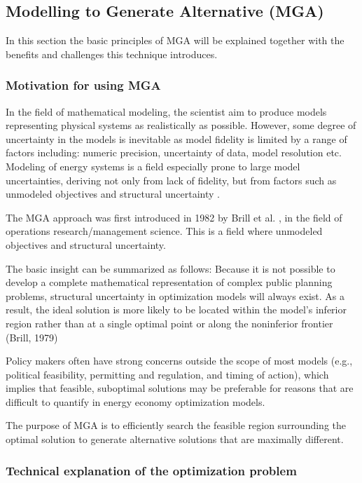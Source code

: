 \subsection{Modelling to Generate Alternative (MGA)}
In this section the basic principles of MGA will be explained together with the benefits and challenges this technique introduces. 

\subsubsection{Motivation for using MGA}

In the field of mathematical modeling, the scientist aim to produce models representing physical systems as realistically as possible. However, some degree of uncertainty in the models is inevitable as model fidelity is limited by a range of factors including: numeric precision, uncertainty of data, model resolution etc. Modeling of energy systems is a field especially prone to large model uncertainties, deriving not only from lack of fidelity, but from factors such as unmodeled objectives and structural uncertainty \cite{DeCarolis_MGA}. 

The MGA approach was first introduced in 1982 by Brill et al. \cite{Brill_MGA_1982}, in the field of operations research/management science. This is a field where unmodeled objectives and structural uncertainty. 


The basic insight can be
summarized as follows: Because it is not possible to develop a complete
mathematical representation of complex public planning problems,
structural uncertainty in optimization models will always exist. As a
result, the ideal solution is more likely to be located within the model's
inferior region rather than at a single optimal point or along the noninferior frontier (Brill, 1979)

Policy makers often have strong concerns outside the scope of most models
(e.g., political feasibility, permitting and regulation, and timing of
action), which implies that feasible, suboptimal solutions may be
preferable for reasons that are difficult to quantify in energy economy
optimization models.

The purpose of MGA is to efficiently search the feasible
region surrounding the optimal solution to generate alternative
solutions that are maximally different. 

\subsubsection{Technical explanation of the optimization problem}


